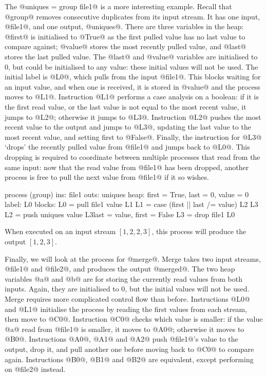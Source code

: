 The @uniques = group file1@ is a more interesting example.
Recall that @group@ removes consecutive duplicates from its input stream.
It has one input, @file1@, and one output, @uniques@.
There are three variables in the heap: @first@ is initialised to @True@ as the first pulled value has no last value to compare against; @value@ stores the most recently pulled value, and @last@ stores the last pulled value.
The @last@ and @value@ variables are initialised to $0$, but could be initialised to any value: these initial values will not be used.
The initial label is @L0@, which pulls from the input @file1@. This blocks waiting for an input value, and when one is received, it is stored in @value@ and the process moves to @L1@.
Instruction @L1@ performs a case analysis on a boolean: if it is the first read value, or the last value is not equal to the most recent value, it jumps to @L2@; otherwise it jumps to @L3@.
Instruction @L2@ pushes the most recent value to the output and jumps to @L3@, updating the last value to the most recent value, and setting first to @False@.
Finally, the instruction for @L3@ `drops' the recently pulled value from @file1@ and jumps back to @L0@.
This dropping is required to coordinate between multiple processes that read from the same input: now that the read value from @file1@ has been dropped, another process is free to pull the next value from @file1@ if it so wishes.

\begin{code}
process (group)
     ins: file1
    outs: uniques
    heap: {first = True, last = 0, value = 0}
   label: L0
  blocks: L0 = pull file1   value              L1
          L1 = case (first || last /= value)   L2               L3
          L2 = push uniques value              L3{last = value, first = False}
          L3 = drop file1                      L0
\end{code}

When executed on an input stream $[1, 2, 2, 3]$, this process will produce the output $[1, 2, 3]$.

Finally, we will look at the process for @merge@.
Merge takes two input streams, @file1@ and @file2@, and produces the output @merged@.
The two heap variables @a@ and @b@ are for storing the currently read values from both inputs.
Again, they are initialised to $0$, but the initial values will not be used.
Merge requires more complicated control flow than before.
Instructions @L0@ and @L1@ initialise the process by reading the first values from each stream, then move to @C0@.
Instruction @C0@ checks which value is smaller: if the value @a@ read from @file1@ is smaller, it moves to @A0@; otherwise it moves to @B0@.
Instructions @A0@, @A1@ and @A2@ push @file1@'s value to the output, drop it, and pull another one before moving back to @C0@ to compare again.
Instructions @B0@, @B1@ and @B2@ are equivalent, except performing on @file2@ instead.

